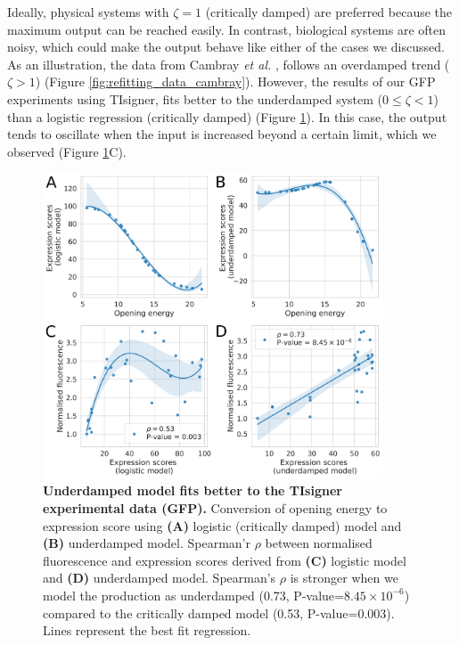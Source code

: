 Ideally, physical systems with $\zeta = 1$ (critically damped) are preferred because the maximum output can be reached easily. In contrast, biological systems are often noisy, which could make the output behave like either of the cases we discussed. As an illustration, the data from Cambray \textit{et al.} \cite{Cambray2018-kn}, follows an overdamped trend ($\zeta > 1$) (Figure \ref{fig:refitting_data_cambray}). However, the results of our GFP experiments using TIsigner, fits better to the underdamped system ($0 \leq \zeta < 1 $) than a logistic regression (critically damped) (Figure \ref{fig:refitting_data_tisigner}). In this case, the output tends to oscillate when the input is increased beyond a certain limit, which we observed (Figure \ref{fig:refitting_data_tisigner}C).


\begin{figure}[htbp!]
\center
\includegraphics[width=0.9\textwidth]{chapters/Discussion/Figures/refitting_tisigner.png}
\caption[Underdamped model fits better to the TIsigner experimental data (GFP).]{\textbf{Underdamped model fits better to the TIsigner experimental data (GFP).} Conversion of opening energy to expression score using \textbf{(A)} logistic (critically damped) model and  \textbf{(B)} underdamped model. Spearman'r $\rho$ between normalised fluorescence and expression scores derived from \textbf{(C)} logistic model and \textbf{(D)} underdamped model. Spearman's $\rho$ is stronger when we model the production as underdamped (0.73, P-value=$8.45\times 10^{-6}$) compared to the critically damped model (0.53, P-value=0.003). Lines represent the best fit regression.}%
\label{fig:refitting_data_tisigner}
\end{figure}

